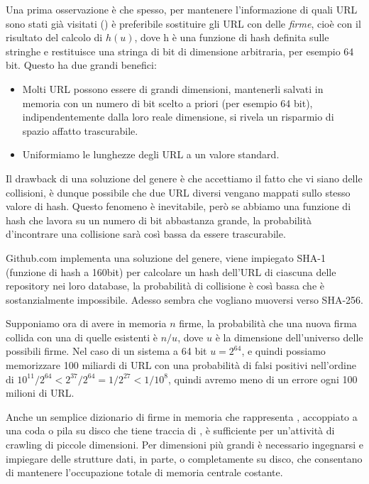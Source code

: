 Una prima osservazione è che spesso, per mantenere l'informazione di quali URL sono stati già visitati () è preferibile sostituire gli URL con delle \textit{firme}, cioè con il risultato del calcolo di $h(u)$, dove h è una funzione di hash definita sulle stringhe e restituisce una stringa di bit di dimensione arbitraria, per esempio 64 bit. Questo ha due grandi benefici:
\begin{itemize}
    \item Molti URL possono essere di grandi dimensioni, mantenerli salvati in memoria con un numero di bit scelto a priori (per esempio 64 bit), indipendentemente dalla loro reale dimensione, si rivela un risparmio di spazio affatto trascurabile.
    \item Uniformiamo le lunghezze degli URL a un valore standard.
\end{itemize}
Il drawback di una soluzione del genere è che accettiamo il fatto che vi siano delle collisioni, è dunque possibile che due URL diversi vengano mappati sullo stesso valore di hash. Questo fenomeno è inevitabile, però se abbiamo una funzione di hash che lavora su un numero di bit abbastanza grande, la probabilità d'incontrare una collisione sarà così bassa da essere trascurabile.

Github.com implementa una soluzione del genere, viene impiegato SHA-1 (funzione di hash a 160bit) per calcolare un hash dell'URL di ciascuna delle repository nei loro database, la probabilità di collisione è così bassa che è sostanzialmente impossibile. Adesso sembra che vogliano muoversi verso SHA-256.

Supponiamo ora di avere in memoria $n$ firme, la probabilità che una nuova firma collida con una di quelle esistenti è $n/u$, dove $u$ è la dimensione dell'universo delle possibili firme. Nel caso di un sistema a 64 bit $u = 2^{64}$, e quindi possiamo memorizzare 100 miliardi di URL con una probabilità di falsi positivi nell'ordine di $10^{11} / 2^{64} < 2^{37} / 2^{64} = 1 / 2^{27} < 1 / 10^8$, quindi avremo meno di un errore ogni 100 milioni di URL.

Anche un semplice dizionario di firme in memoria che rappresenta , accoppiato a una coda o pila su disco che tiene traccia di , è sufficiente per un'attività di crawling di piccole dimensioni. Per dimensioni più grandi è necessario ingegnarsi e impiegare delle strutture dati, in parte, o completamente su disco, che consentano di mantenere l'occupazione totale di memoria centrale costante.


